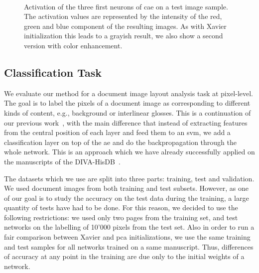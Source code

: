 \documentclass[conference]{IEEEtran}
\begin{document}
\begin{figure}[tb]
  \centering
  \hfill
   \\
  \hfill
  \caption{
    Activation of the three first neurons of \ac{cae} on a test image sample.
    The activation values are represented by the intensity of the red, green and blue component of the resulting images.
    As with Xavier initialization this leads to a grayish result, we also show a second version with color enhancement.
  }
  \label{fig:act}
\end{figure}

\subsection{Classification Task}
We evaluate our method for a document image layout analysis task at pixel-level.
The goal is to label the pixels of a document image as corresponding to different kinds of content, e.g., background or interlinear glosses.
This is a continuation of our previous work~\cite{chen2015page}, with the main difference that instead of extracting features from the central position of each layer and feed them to an \ac{svm}, we add a classification layer on top of the \ac{ae} and do the backpropagation through the whole network.
This is an approach which we have already successfully applied on the manuscripts of the DIVA-HisDB~\cite{simistira1656a}.

The datasets which we use are split into three parts: training, test and validation.
We used document images from both training and test subsets.
However, as one of our goal is to study the accuracy on the test data during the training, a large quantity of tests have had to be done.
For this reason, we decided to use the following restrictions: we used only two pages from the training set, and test networks on the labelling of 10'000 pixels from the test set.
Also in order to run a fair comparison between Xavier and \ac{pca} initializations, we use the same training and test samples for all networks trained on a same manuscript.
Thus, differences of accuracy at any point in the training are due only to the initial weights of a network.
\end{document}
